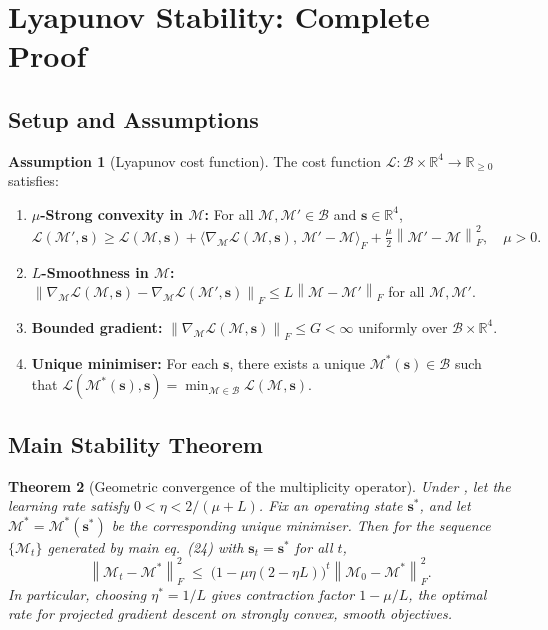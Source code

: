 \documentclass[12pt,letterpaper]{article}
\theoremstyle{plain}
\newtheorem{theorem}{Theorem}[section]
\theoremstyle{definition}
\newtheorem{assumption}[theorem]{Assumption}
\newcommand{\M}{\mathcal{M}}
\newcommand{\calB}{\mathcal{B}}
\newcommand{\calL}{\mathcal{L}}
\newcommand{\frnorm}[1]{\left\|#1\right\|_{F}}
\newcommand{\R}{\mathbb{R}}
\begin{document}
\section{Lyapunov Stability: Complete Proof}
\label{app:lyapunov}

\subsection{Setup and Assumptions}

\begin{assumption}[Lyapunov cost function]
\label{ass:lyapunov}
The cost function \(\calL : \calB \times \R^4 \to \R_{\geq 0}\) satisfies:
\begin{enumerate}[label=(\roman*)]
  \item \textbf{\(\mu\)-Strong convexity in \(\M\):}
    For all \(\M, \M' \in \calB\) and \(\mathbf{s} \in \R^4\),
    \[
      \calL(\M', \mathbf{s}) \geq \calL(\M, \mathbf{s})
        + \langle \nabla_{\!\M}\calL(\M,\mathbf{s}),\, \M'-\M \rangle_F
        + \tfrac{\mu}{2}\frnorm{\M'-\M}^2, \quad \mu > 0.
    \]
  \item \textbf{\(L\)-Smoothness in \(\M\):}
    \(\frnorm{\nabla_{\!\M}\calL(\M,\mathbf{s})
      - \nabla_{\!\M}\calL(\M',\mathbf{s})}
    \leq L\frnorm{\M-\M'}\) for all \(\M, \M'\).
  \item \textbf{Bounded gradient:}
    \(\frnorm{\nabla_{\!\M}\calL(\M,\mathbf{s})} \leq G < \infty\)
    uniformly over \(\calB \times \R^4\).
  \item \textbf{Unique minimiser:}
    For each \(\mathbf{s}\), there exists a unique
    \(\M^*(\mathbf{s}) \in \calB\) such that
    \(\calL(\M^*(\mathbf{s}),\mathbf{s})
    = \min_{\M\in\calB}\calL(\M,\mathbf{s})\).
\end{enumerate}
\end{assumption}

\subsection{Main Stability Theorem}

\begin{theorem}[Geometric convergence of the multiplicity operator]
\label{thm:lyapunov}
Under , let the learning rate satisfy
\(0 < \eta < 2/(\mu + L)\).
Fix an operating state \(\mathbf{s}^*\), and let
\(\M^* = \M^*(\mathbf{s}^*)\) be the corresponding unique minimiser.
Then for the sequence \(\{\M_t\}\) generated by main eq.~(24)
with \(\mathbf{s}_t = \mathbf{s}^*\) for all \(t\),
\[
  \frnorm{\M_t - \M^*}^2 \;\leq\;
    \bigl(1 - \mu\eta(2 - \eta L)\bigr)^t
    \frnorm{\M_0 - \M^*}^2.
\]
In particular, choosing \(\eta^* = 1/L\) gives contraction factor
\(1 - \mu/L\), the optimal rate for projected gradient descent on
strongly convex, smooth objectives.
\end{theorem}
\end{document}
